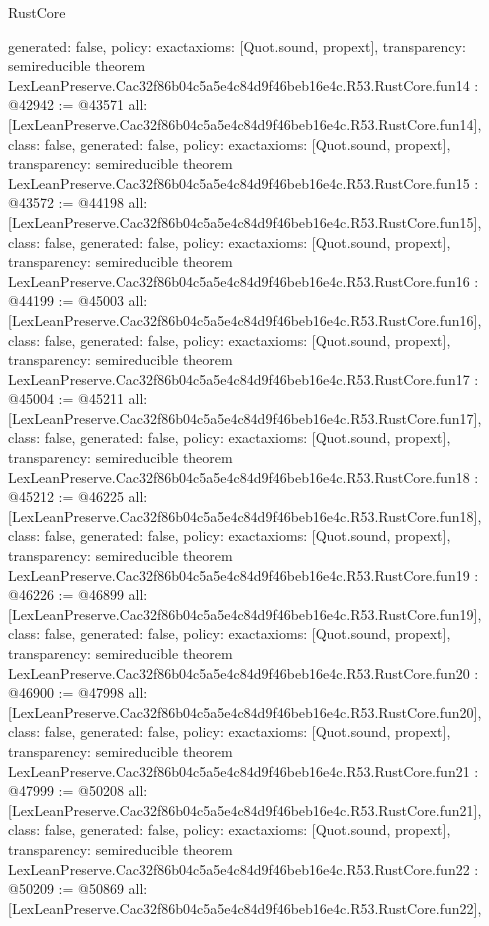 \begin{lexlean}{RustCore}
\begin{coremodule}
{  generated: false,
  policy: exact{axioms: [Quot.sound, propext]},
  transparency: semireducible
}
theorem LexLeanPreserve.Cac32f86b04c5a5e4c84d9f46beb16e4c.R53.RustCore.fun14 : @42942 := @43571 {
  all: [LexLeanPreserve.Cac32f86b04c5a5e4c84d9f46beb16e4c.R53.RustCore.fun14],
  class: false,
  generated: false,
  policy: exact{axioms: [Quot.sound, propext]},
  transparency: semireducible
}
theorem LexLeanPreserve.Cac32f86b04c5a5e4c84d9f46beb16e4c.R53.RustCore.fun15 : @43572 := @44198 {
  all: [LexLeanPreserve.Cac32f86b04c5a5e4c84d9f46beb16e4c.R53.RustCore.fun15],
  class: false,
  generated: false,
  policy: exact{axioms: [Quot.sound, propext]},
  transparency: semireducible
}
theorem LexLeanPreserve.Cac32f86b04c5a5e4c84d9f46beb16e4c.R53.RustCore.fun16 : @44199 := @45003 {
  all: [LexLeanPreserve.Cac32f86b04c5a5e4c84d9f46beb16e4c.R53.RustCore.fun16],
  class: false,
  generated: false,
  policy: exact{axioms: [Quot.sound, propext]},
  transparency: semireducible
}
theorem LexLeanPreserve.Cac32f86b04c5a5e4c84d9f46beb16e4c.R53.RustCore.fun17 : @45004 := @45211 {
  all: [LexLeanPreserve.Cac32f86b04c5a5e4c84d9f46beb16e4c.R53.RustCore.fun17],
  class: false,
  generated: false,
  policy: exact{axioms: [Quot.sound, propext]},
  transparency: semireducible
}
theorem LexLeanPreserve.Cac32f86b04c5a5e4c84d9f46beb16e4c.R53.RustCore.fun18 : @45212 := @46225 {
  all: [LexLeanPreserve.Cac32f86b04c5a5e4c84d9f46beb16e4c.R53.RustCore.fun18],
  class: false,
  generated: false,
  policy: exact{axioms: [Quot.sound, propext]},
  transparency: semireducible
}
theorem LexLeanPreserve.Cac32f86b04c5a5e4c84d9f46beb16e4c.R53.RustCore.fun19 : @46226 := @46899 {
  all: [LexLeanPreserve.Cac32f86b04c5a5e4c84d9f46beb16e4c.R53.RustCore.fun19],
  class: false,
  generated: false,
  policy: exact{axioms: [Quot.sound, propext]},
  transparency: semireducible
}
theorem LexLeanPreserve.Cac32f86b04c5a5e4c84d9f46beb16e4c.R53.RustCore.fun20 : @46900 := @47998 {
  all: [LexLeanPreserve.Cac32f86b04c5a5e4c84d9f46beb16e4c.R53.RustCore.fun20],
  class: false,
  generated: false,
  policy: exact{axioms: [Quot.sound, propext]},
  transparency: semireducible
}
theorem LexLeanPreserve.Cac32f86b04c5a5e4c84d9f46beb16e4c.R53.RustCore.fun21 : @47999 := @50208 {
  all: [LexLeanPreserve.Cac32f86b04c5a5e4c84d9f46beb16e4c.R53.RustCore.fun21],
  class: false,
  generated: false,
  policy: exact{axioms: [Quot.sound, propext]},
  transparency: semireducible
}
theorem LexLeanPreserve.Cac32f86b04c5a5e4c84d9f46beb16e4c.R53.RustCore.fun22 : @50209 := @50869 {
  all: [LexLeanPreserve.Cac32f86b04c5a5e4c84d9f46beb16e4c.R53.RustCore.fun22],
}
\end{coremodule}
\end{lexlean}
